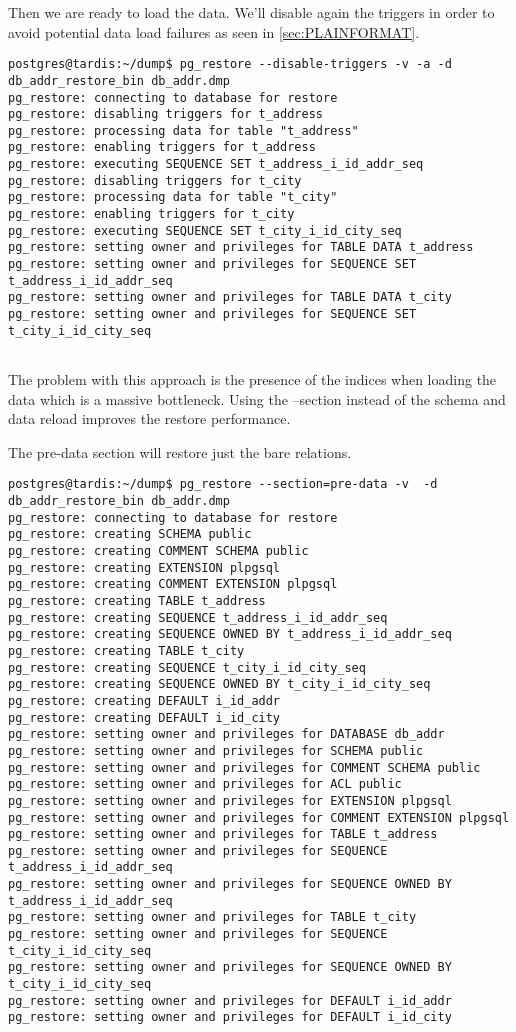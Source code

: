 Then we are ready to load the data. We'll disable again the triggers in order to avoid potential data 
load failures as seen in \ref{sec:PLAINFORMAT}.

\begin{verbatim}
postgres@tardis:~/dump$ pg_restore --disable-triggers -v -a -d db_addr_restore_bin db_addr.dmp 
pg_restore: connecting to database for restore
pg_restore: disabling triggers for t_address
pg_restore: processing data for table "t_address"
pg_restore: enabling triggers for t_address
pg_restore: executing SEQUENCE SET t_address_i_id_addr_seq
pg_restore: disabling triggers for t_city
pg_restore: processing data for table "t_city"
pg_restore: enabling triggers for t_city
pg_restore: executing SEQUENCE SET t_city_i_id_city_seq
pg_restore: setting owner and privileges for TABLE DATA t_address
pg_restore: setting owner and privileges for SEQUENCE SET t_address_i_id_addr_seq
pg_restore: setting owner and privileges for TABLE DATA t_city
pg_restore: setting owner and privileges for SEQUENCE SET t_city_i_id_city_seq
 
\end{verbatim}

The problem with this approach is the presence of the indices when loading the data which is a massive 
bottleneck. Using the --section instead of the schema and data reload improves the restore 
performance.\newline

The pre-data section will restore just the bare relations.
\begin{verbatim}
postgres@tardis:~/dump$ pg_restore --section=pre-data -v  -d db_addr_restore_bin db_addr.dmp 
pg_restore: connecting to database for restore
pg_restore: creating SCHEMA public
pg_restore: creating COMMENT SCHEMA public
pg_restore: creating EXTENSION plpgsql
pg_restore: creating COMMENT EXTENSION plpgsql
pg_restore: creating TABLE t_address
pg_restore: creating SEQUENCE t_address_i_id_addr_seq
pg_restore: creating SEQUENCE OWNED BY t_address_i_id_addr_seq
pg_restore: creating TABLE t_city
pg_restore: creating SEQUENCE t_city_i_id_city_seq
pg_restore: creating SEQUENCE OWNED BY t_city_i_id_city_seq
pg_restore: creating DEFAULT i_id_addr
pg_restore: creating DEFAULT i_id_city
pg_restore: setting owner and privileges for DATABASE db_addr
pg_restore: setting owner and privileges for SCHEMA public
pg_restore: setting owner and privileges for COMMENT SCHEMA public
pg_restore: setting owner and privileges for ACL public
pg_restore: setting owner and privileges for EXTENSION plpgsql
pg_restore: setting owner and privileges for COMMENT EXTENSION plpgsql
pg_restore: setting owner and privileges for TABLE t_address
pg_restore: setting owner and privileges for SEQUENCE t_address_i_id_addr_seq
pg_restore: setting owner and privileges for SEQUENCE OWNED BY t_address_i_id_addr_seq
pg_restore: setting owner and privileges for TABLE t_city
pg_restore: setting owner and privileges for SEQUENCE t_city_i_id_city_seq
pg_restore: setting owner and privileges for SEQUENCE OWNED BY t_city_i_id_city_seq
pg_restore: setting owner and privileges for DEFAULT i_id_addr
pg_restore: setting owner and privileges for DEFAULT i_id_city
 
\end{verbatim}

